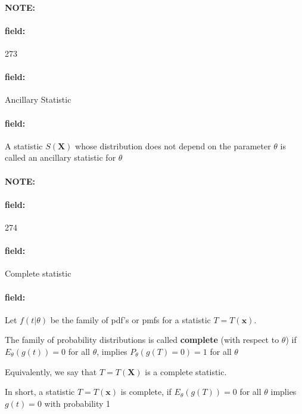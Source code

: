 \documentclass[12pt]{article}
\newenvironment{note}{\paragraph{NOTE:}}{}
\newenvironment{field}{\paragraph{field:}}{}
\begin{document}
\begin{note} \begin{field} \tiny 273 \end{field}
  \begin{field}
    Ancillary Statistic
  \end{field}
  \begin{field}
    A statistic $S(\mathbf{X})$ whose distribution does not depend on the parameter $\theta$ is called an ancillary statistic for $\theta$
  \end{field}
\end{note}



\begin{note} \begin{field} \tiny 274 \end{field}
  \begin{field}
    Complete statistic
  \end{field}
  \begin{field}
    Let $f(t|\theta)$ be the family of pdf's or pmfs for a statistic $T= T(\mathbf{x})$.

    The family of probability distributions is called \textbf{complete} (with respect to $\theta$) if $E_\theta(g(t)) = 0$ for all $\theta$, implies $P_\theta(g(T) = 0) = 1$ for all $\theta$

    Equivalently, we say that $T = T(\mathbf{X})$ is a complete statistic.

    In short, a statistic $T = T(\mathbf{x})$ is complete, if $E_\theta(g(T)) = 0$ for all $\theta$ implies $g(t) = 0$ with probability 1
  \end{field}
\end{note}
\end{document}
